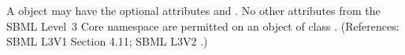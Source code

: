A \ListOfModifierSpeciesReferences object may have the optional attributes
 and .  No other attributes from the SBML
Level~3 Core namespace are permitted on an object of class
\ListOfModifierSpeciesReferences.  (References: SBML L3V1 Section 4.11; SBML L3V2
.)

